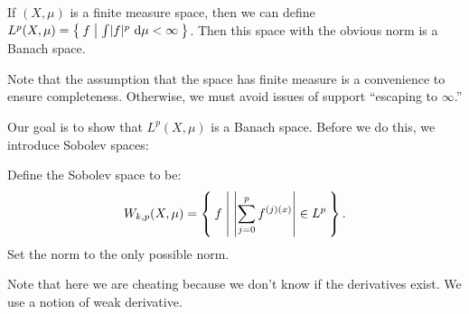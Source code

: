 \documentclass[10pt, twoside]{article}
\renewcommand{\d}{\ \mathrm{d}}
\begin{document}
    \begin{exm} If $(X, \mu)$ is a finite measure space, then we can define
        $L^p(X, \mu) = \Set{f | \int \abs{f}^p \d \mu < \infty}$. Then this
        space with the obvious norm is a Banach space.

        Note that the assumption that the space has finite measure is a
    convenience to ensure completeness. Otherwise, we must avoid issues of
support ``escaping to $\infty$.'' \end{exm}

    Our goal is to show that $L^p(X, \mu)$ is a Banach space. Before we do
    this, we introduce Sobolev spaces:

    \begin{defn} Define the Sobolev space to be:
        \[W_{k,p}(X,\mu) = \Set{f | \abs*{\sum_{j=0}^p f^{(j)(x)}} \in L^p}.\]
        Set the norm to the only possible norm.

        Note that here we are cheating because we don't know if the derivatives
    exist. We use a notion of weak derivative.  \end{defn}
\end{document}
